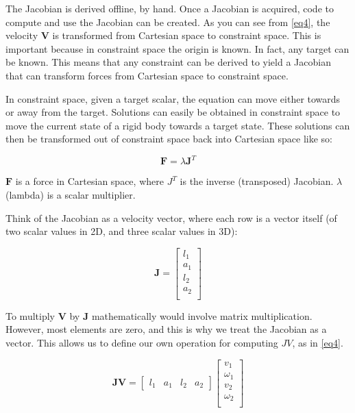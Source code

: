 The Jacobian is derived offline, by hand. Once a Jacobian is acquired, code to compute and use the Jacobian can be created. As you can see from \eqref{eq4}, the velocity \(\mathbf{V}\) is transformed from Cartesian space to constraint space. This is important because in constraint space the origin is known. In fact, any target can be known. This means that any constraint can be derived to yield a Jacobian that can transform forces from Cartesian space to constraint space.

In constraint space, given a target scalar, the equation can move either towards or away from the target. Solutions can easily be obtained in constraint space to move the current state of a rigid body towards a target state. These solutions can then be transformed out of constraint space back into Cartesian space like so:

\begin{equation}
\mathbf{F} = \lambda \mathbf{J}^T
\label{eq5}
\end{equation}

\(\mathbf{F}\) is a force in Cartesian space, where \(J^T\) is the inverse (transposed) Jacobian. \(\lambda\) (lambda) is a scalar multiplier.

Think of the Jacobian as a velocity vector, where each row is a vector itself (of two scalar values in 2D, and three scalar values in 3D):

\begin{equation}
\mathbf{J} = \begin{bmatrix}
l_1 \\
a_1 \\
l_2 \\
a_2 \\
\end{bmatrix}
\label{eq6}
\end{equation}

To multiply \(\mathbf{V}\) by \(\mathbf{J}\) mathematically would involve matrix multiplication. However, most elements are zero, and this is why we treat the Jacobian as a vector. This allows us to define our own operation for computing \(JV\), as in \eqref{eq4}.

\begin{equation}
\mathbf{JV} = \begin{bmatrix}
l_1 & a_1 & l_2 & a_2
\end{bmatrix}
\begin{bmatrix}
v_1 \\
\omega_1 \\
v_2 \\
\omega_2 \\
\end{bmatrix}
\label{eq7}
\end{equation}

